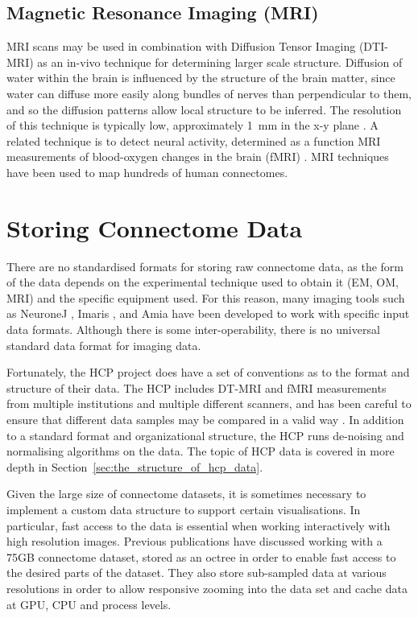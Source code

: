 \documentclass[MSc,paper=a4,pagesize=auto]{icldt}
\begin{document}
\subsection{Magnetic Resonance Imaging (MRI)} 
MRI scans may be used in combination with Diffusion Tensor Imaging (DTI-MRI) as an in-vivo technique for determining larger scale structure. Diffusion of water within the brain is influenced by the structure of the brain matter, since water can diffuse more easily along bundles of nerves than perpendicular to them, and so the diffusion patterns allow local structure to be inferred. The resolution of this technique is typically low, approximately \SI{1}{\mm} in the x-y plane \cite{Westin2002}. A related technique is to detect neural activity, determined as a function MRI measurements of blood-oxygen changes in the brain (fMRI) \cite{Huettel2004}. MRI techniques have been used to map hundreds of human connectomes. 


\section{Storing Connectome Data}
There are no standardised formats for storing raw connectome data, as the form of the data depends on the experimental technique used to obtain it (EM, OM, MRI) and the specific equipment used. For this reason, many imaging tools such as NeuroneJ \cite{NeuronJ2014}, Imaris \cite{Imaris2014}, and Amia \cite{Amira2014} have been developed to work with specific input data formats. Although there is some inter-operability, there is no universal standard data format for imaging data. 

Fortunately, the HCP project does have a set of conventions as to the format and structure of their data. The HCP includes DT-MRI and fMRI measurements from multiple institutions and multiple different scanners, and has been careful to ensure that different data samples may be compared in a valid way \cite{HCP_Logistics_2014}.  In addition to a standard format and organizational structure, the HCP runs de-noising and normalising algorithms on the data. The topic of HCP data is covered in more depth in Section~\ref{sec:the_structure_of_hcp_data}.

Given the large size of connectome datasets, it is sometimes necessary to implement a custom data structure to support certain visualisations. In particular, fast access to the data is essential when working interactively with high resolution images. Previous publications \cite{Jeong2010} have discussed working with a 75GB connectome dataset, stored as an octree in order to enable fast access to the desired parts of the dataset. They also store sub-sampled data at various resolutions in order to allow responsive zooming into the data set and cache data at GPU, CPU and process levels. 
\end{document}
